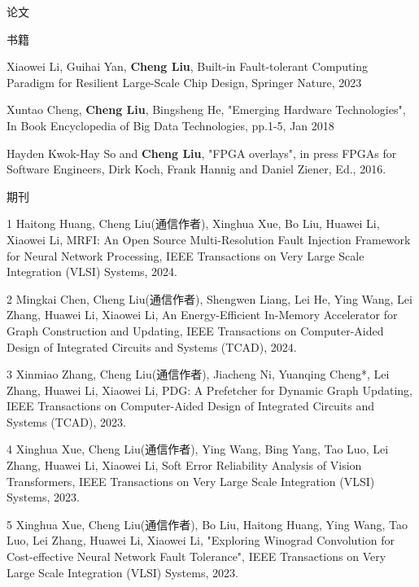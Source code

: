 \documentclass{resume} %
\begin{document}
\begin{rSection}{论文}
    \begin{rSubsection} {书籍}{}{}{}
    \item Xiaowei Li, Guihai Yan, \textbf{Cheng Liu}, Built-in Fault-tolerant Computing Paradigm for Resilient Large-Scale Chip Design, Springer Nature, 2023

	\item Xuntao Cheng, \textbf{Cheng Liu}, Bingsheng He, "Emerging Hardware Technologies", In Book 
		Encyclopedia of Big Data Technologies, pp.1-5, Jan 2018

    \item Hayden Kwok-Hay So and \textbf{Cheng Liu}, "FPGA overlays", in press FPGAs for Software
        Engineers, Dirk Koch, Frank Hannig and Daniel Ziener, Ed., 2016.  
    \end{rSubsection}

    \begin{rSubsection} {期刊}{}{}{}
    \item 1 Haitong Huang, Cheng Liu(通信作者), Xinghua Xue, Bo Liu, Huawei Li, Xiaowei Li, MRFI: An Open Source Multi-Resolution Fault Injection Framework for Neural Network Processing, IEEE Transactions on Very Large Scale Integration (VLSI) Systems, 2024.

    \item 2 Mingkai Chen, Cheng Liu(通信作者), Shengwen Liang, Lei He, Ying Wang, Lei Zhang, Huawei Li, Xiaowei Li, An Energy-Efficient In-Memory Accelerator for Graph Construction and Updating, IEEE Transactions on Computer-Aided Design of Integrated Circuits and Systems (TCAD), 2024.

    \item 3 Xinmiao Zhang, Cheng Liu(通信作者), Jiacheng Ni, Yuanqing Cheng*, Lei Zhang, Huawei Li, Xiaowei Li, PDG: A Prefetcher for Dynamic Graph Updating, IEEE Transactions on Computer-Aided Design of Integrated Circuits and Systems (TCAD), 2023.

    \item 4 Xinghua Xue, Cheng Liu(通信作者), Ying Wang, Bing Yang, Tao Luo, Lei Zhang, Huawei Li, Xiaowei Li, Soft Error Reliability Analysis of Vision Transformers, IEEE Transactions on Very Large Scale Integration (VLSI) Systems, 2023.
    \item 5 Xinghua Xue, Cheng Liu(通信作者), Bo Liu, Haitong Huang, Ying Wang, Tao Luo, Lei Zhang, Huawei Li, Xiaowei Li, "Exploring Winograd Convolution for Cost-effective Neural Network Fault Tolerance", IEEE Transactions on Very Large Scale Integration (VLSI) Systems, 2023.


\end{rSubsection}
\end{rSection}
\end{document}
